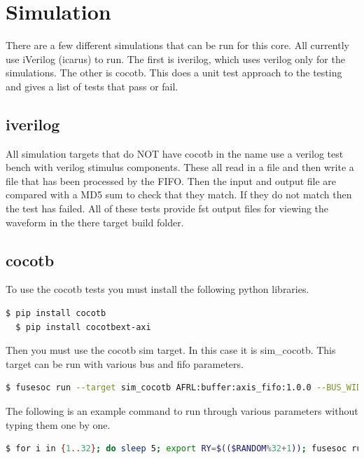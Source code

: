 \newpage

\section{Simulation}
\par
There are a few different simulations that can be run for this core. All currently use iVerilog (icarus) to run. The first is iverilog, which
uses verilog only for the simulations. The other is cocotb. This does a unit test approach to the testing and gives a list of tests that pass
or fail.

\subsection{iverilog}
\par
All simulation targets that do NOT have cocotb in the name use a verilog test bench with verilog stimulus components. These all read in a file
and then write a file that has been processed by the FIFO. Then the input and output file are compared with a MD5 sum to check that they
match. If they do not match then the test has failed. All of these tests provide fst output files for viewing the waveform in the there
target build folder.

\subsection{cocotb}
\par
To use the cocotb tests you must install the following python libraries.
\begin{lstlisting}[language=bash]
  $ pip install cocotb
  $ pip install cocotbext-axi
\end{lstlisting}

Then you must use the cocotb sim target. In this case it is sim\_cocotb. This target can be run with various bus and fifo parameters.
\begin{lstlisting}[language=bash]
  $ fusesoc run --target sim_cocotb AFRL:buffer:axis_fifo:1.0.0 --BUS_WIDTH=8 --FIFO_DEPTH=32
\end{lstlisting}

The following is an example command to run through various parameters without typing them one by one.
\begin{lstlisting}[language=bash]
  $ for i in {1..32}; do sleep 5; export RY=$(($RANDOM%32+1)); fusesoc run --target sim_cocotb AFRL:buffer:axis_fifo:1.0.0 --BUS_WIDTH=$i --FIFO_DEPTH=$RY; echo "BUS WIDTH:" $i "FIFO DEPTH:" $RY; done
\end{lstlisting}
\newpage

